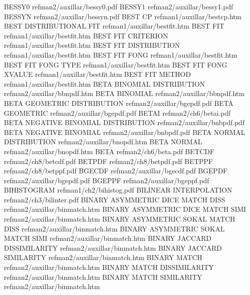 BESSY0                                  refman2/auxillar/bessy0.pdf
BESSY1                                  refman2/auxillar/bessy1.pdf
BESSYN                                  refman2/auxillar/bessyn.pdf
BEST CP                                 refman1/auxillar/bestcp.htm
BEST DISTRIBUTIONAL FIT                 refman1/auxillar/bestfit.htm
BEST FIT                                refman1/auxillar/bestfit.htm
BEST FIT CRITERION                      refman1/auxillar/bestfit.htm
BEST FIT DISTRIBUTION                   refman1/auxillar/bestfit.htm
BEST FIT FONG                           refman1/auxillar/bestfit.htm
BEST FIT FONG TYPE                      refman1/auxillar/bestfit.htm
BEST FIT FONG XVALUE                    refman1/auxillar/bestfit.htm
BEST FIT METHOD                         refman1/auxillar/bestfit.htm
BETA BINOMIAL DISTRIBUTION              refman2/auxillar/bbnpdf.htm
BETA BINOMIAL                           refman2/auxillar/bbnpdf.htm
BETA GEOMETRIC DISTRIBUTION             refman2/auxillar/bgepdf.pdf
BETA GEOMETRIC                          refman2/auxillar/bgepdf.pdf
BETAI                                   refman2/ch6/betai.pdf
BETA NEGATIVE BINOMIAL DISTRIBUTION     refman2/auxillar/bnbpdf.pdf
BETA NEGATIVE BINOMIAL                  refman2/auxillar/bnbpdf.pdf
BETA NORMAL DISTRIBUTION                refman2/auxillar/bnopdf.htm
BETA NORMAL                             refman2/auxillar/bnopdf.htm
BETA                                    refman2/ch6/beta.pdf
BETCDF                                  refman2/ch8/betcdf.pdf
BETPDF                                  refman2/ch8/betpdf.pdf
BETPPF                                  refman2/ch8/betppf.pdf
BGECDF                                  refman2/auxillar/bgecdf.pdf
BGEPDF                                  refman2/auxillar/bgepdf.pdf
BGEPPF                                  refman2/auxillar/bgeppf.pdf
BIHISTOGRAM                             refman1/ch2/bihistog.pdf
BILINEAR INTERPOLATION                  refman2/ch3/bilinter.pdf
BINARY ASYMMETRIC DICE MATCH DISS       refman2/auxillar/binmatch.htm
BINARY ASYMMETRIC DICE MATCH SIMI       refman2/auxillar/binmatch.htm
BINARY ASYMMETRIC SOKAL MATCH DISS      refman2/auxillar/binmatch.htm
BINARY ASYMMETRIC SOKAL MATCH SIMI      refman2/auxillar/binmatch.htm
BINARY JACCARD DISSIMILARITY            refman2/auxillar/binmatch.htm
BINARY JACCARD SIMILARITY               refman2/auxillar/binmatch.htm
BINARY MATCH                            refman2/auxillar/binmatch.htm
BINARY MATCH DISSIMILARITY              refman2/auxillar/binmatch.htm
BINARY MATCH SIMILARITY                 refman2/auxillar/binmatch.htm
